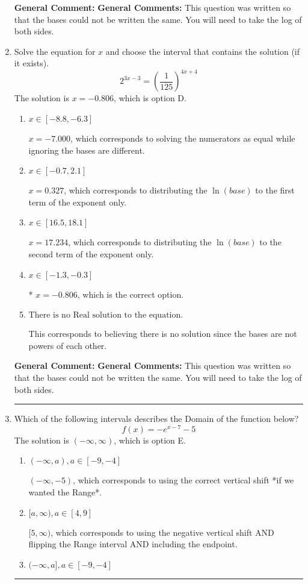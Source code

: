\documentclass{extbook}[14pt]
\newcommand{\litem}[1]{\item #1

\rule{\textwidth}{0.4pt}}
\begin{document}
\begin{enumerate}
{\textbf{General Comment:} \textbf{General Comments:} This question was written so that the bases could not be written the same. You will need to take the log of both sides.
}
\litem{
Solve the equation for $x$ and choose the interval that contains the solution (if it exists).
\[ 2^{3x-3} = \left(\frac{1}{125}\right)^{4x+4} \]The solution is \( x = -0.806 \), which is option D.\begin{enumerate}[label=\Alph*.]
\item \( x \in [-8.8, -6.3] \)

$x = -7.000$, which corresponds to solving the numerators as equal while ignoring the bases are different.
\item \( x \in [-0.7, 2.1] \)

$x = 0.327$, which corresponds to distributing the $\ln(base)$ to the first term of the exponent only.
\item \( x \in [16.5, 18.1] \)

$x = 17.234$, which corresponds to distributing the $\ln(base)$ to the second term of the exponent only.
\item \( x \in [-1.3, -0.3] \)

* $x = -0.806$, which is the correct option.
\item \( \text{There is no Real solution to the equation.} \)

This corresponds to believing there is no solution since the bases are not powers of each other.
\end{enumerate}

\textbf{General Comment:} \textbf{General Comments:} This question was written so that the bases could not be written the same. You will need to take the log of both sides.
}
\litem{
Which of the following intervals describes the Domain of the function below?
\[ f(x) = -e^{x-7}-5 \]The solution is \( (-\infty, \infty) \), which is option E.\begin{enumerate}[label=\Alph*.]
\item \( (-\infty, a), a \in [-9, -4] \)

$(-\infty, -5)$, which corresponds to using the correct vertical shift *if we wanted the Range*.
\item \( [a, \infty), a \in [4, 9] \)

$[5, \infty)$, which corresponds to using the negative vertical shift AND flipping the Range interval AND including the endpoint.
\item \( (-\infty, a], a \in [-9, -4] \)


\end{enumerate}}
\end{enumerate}
\end{document}
